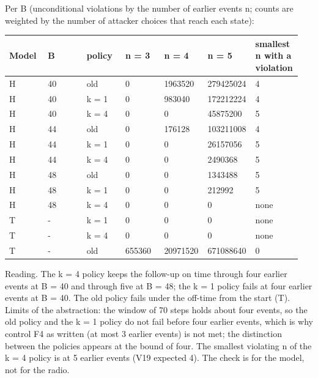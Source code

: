 Per B (unconditional violations by the number of earlier events n; counts are weighted by the number of attacker choices that reach each state):

{\scriptsize\raggedright
\begin{longtable}{p{0.136\linewidth}p{0.136\linewidth}p{0.136\linewidth}p{0.136\linewidth}p{0.136\linewidth}p{0.136\linewidth}p{0.136\linewidth}}
\toprule
Model & B & policy & n = 3 & n = 4 & n = 5 & smallest n with a violation \\
\midrule
\endhead
H & 40 & old & 0 & 1963520 & 279425024 & 4 \\
H & 40 & k = 1 & 0 & 983040 & 172212224 & 4 \\
H & 40 & k = 4 & 0 & 0 & 45875200 & 5 \\
H & 44 & old & 0 & 176128 & 103211008 & 4 \\
H & 44 & k = 1 & 0 & 0 & 26157056 & 5 \\
H & 44 & k = 4 & 0 & 0 & 2490368 & 5 \\
H & 48 & old & 0 & 0 & 1343488 & 5 \\
H & 48 & k = 1 & 0 & 0 & 212992 & 5 \\
H & 48 & k = 4 & 0 & 0 & 0 & none \\
T & - & k = 1 & 0 & 0 & 0 & none \\
T & - & k = 4 & 0 & 0 & 0 & none \\
T & - & old & 655360 & 20971520 & 671088640 & 0 \\
\bottomrule
\end{longtable}}

Reading. The k = 4 policy keeps the follow-up on time through four earlier events at B = 40 and through five at B = 48; the k = 1 policy fails at four earlier events at B = 40. The old policy fails under the off-time from the start (T). Limits of the abstraction: the window of 70 steps holds about four events, so the old policy and the k = 1 policy do not fail before four earlier events, which is why control F4 as written (at most 3 earlier events) is not met; the distinction between the policies appears at the bound of four. The smallest violating n of the k = 4 policy is at 5 earlier events (V19 expected 4). The check is for the model, not for the radio.

